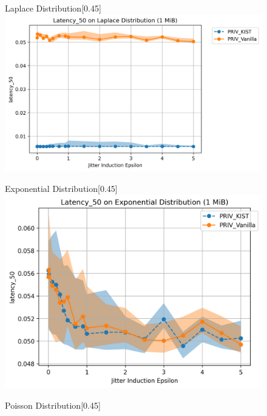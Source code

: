 \begin{figure}[htbp]
    \centering
    \begin{subcaptionbox}{Laplace Distribution\label{fig:jitter_latency_laplace}}[0.45\textwidth]
        {\includegraphics[width=\linewidth]{Chapters/Figures/Plots/Jitter/latency_jitter_Laplace_1_mib.png}}
    \end{subcaptionbox}
    \hfill
    \begin{subcaptionbox}{Exponential Distribution\label{fig:jitter_latency_exponential}}[0.45\textwidth]
        {\includegraphics[width=\linewidth]{Chapters/Figures/Plots/Jitter/latency_jitter_Exponential_1_mib.png}}
    \end{subcaptionbox}
    \hfill
    \begin{subcaptionbox}{Poisson Distribution\label{fig:jitter_latency_poisson}}[0.45\textwidth]

\end{subcaptionbox}
\end{figure}
